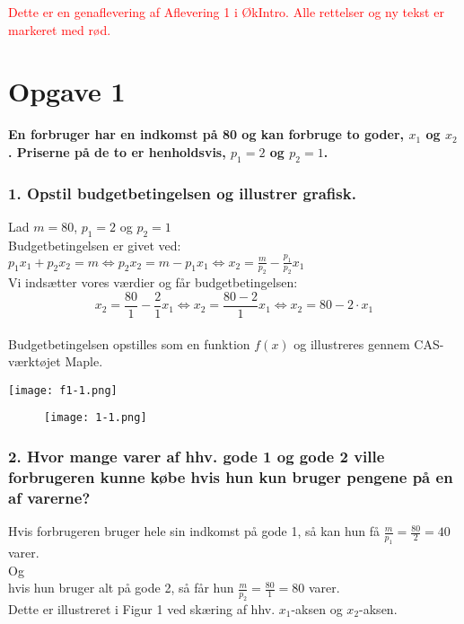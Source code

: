 \documentclass[a4paper, 12pt]{article}
\begin{document}
 
\textcolor{red}{ Dette er en genaflevering af Aflevering 1 i ØkIntro.
Alle rettelser og ny tekst er markeret med rød.}\\

\section*{Opgave 1} 

\textbf{En forbruger har en indkomst på 80 og kan forbruge to goder, $x_{1}$ og $x_{2}$. Priserne på de to er henholdsvis, $p_{1}=2$ og $p_{2}=1$.}
\subsubsection*{1. Opstil budgetbetingelsen og illustrer grafisk.}
Lad $m=80$, $p_{1}=2$ og $p_{2}=1$
\\
Budgetbetingelsen er givet ved: $p_{1}x_{1} + p_{2}x_{2} = m \Leftrightarrow p_{2}x_{2} = m - p_{1}x_{1} \Leftrightarrow x_{2} = \frac{m}{p_{2}} - \frac{p_{1}}{p_{2}} x_{1}$
\\
Vi indsætter vores værdier og får budgetbetingelsen:
$$x_{2} = \frac{80}{1} - \frac{2}{1}x_{1} \Leftrightarrow x_{2} = \frac{80 - 2}{1}x_{1} \Leftrightarrow x_{2} = 80 - 2\cdot x_{1}$$
\\
Budgetbetingelsen opstilles som en funktion $f(x)$ og illustreres gennem CAS-værktøjet Maple.

\texttt{[image: f1-1.png]}

\FloatBarrier
\begin{center}
	\begin{figure}[!ht]	
		\centering	
\texttt{[image: 1-1.png]}
		\caption{}
	\end{figure}
\end{center}
\FloatBarrier

\subsubsection*{2. Hvor mange varer af hhv. gode 1 og gode 2 ville forbrugeren kunne købe hvis hun kun bruger pengene på en af varerne?}
Hvis forbrugeren bruger hele sin indkomst på gode 1, så kan hun få $\frac{m}{p_{1}} = \frac{80}{2} = 40$ varer.
\\
Og
\\
hvis hun bruger alt på gode 2, så får hun $\frac{m}{p_{2}} = \frac{80}{1}=80$ varer.
\\
Dette er illustreret i Figur 1 ved skæring af hhv. $x_{1}$-aksen og $x_{2}$-aksen.
\end{document}
